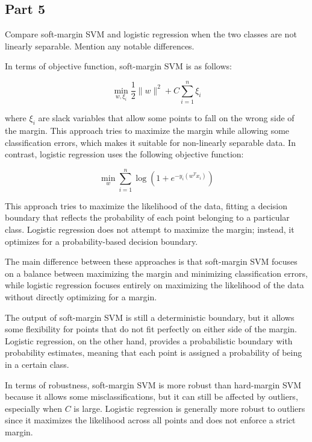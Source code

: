 \subsection{Part 5}
Compare soft-margin SVM and logistic regression when the two classes are not linearly separable. Mention any notable differences.
\begin{qsolve}
	\begin{qsolve}[]
		In terms of objective function, soft-margin SVM is as follows:

		\[
		\min_{w, \xi_i} \frac{1}{2} \|w\|^2 + C \sum_{i=1}^{n} \xi_i
		\]

		where \( \xi_i \) are slack variables that allow some points to fall on the wrong side of the margin. This approach tries to maximize the margin while allowing some classification errors, which makes it suitable for non-linearly separable data. In contrast, logistic regression uses the following objective function:

		\[
		\min_{w} \sum_{i=1}^{n} \log(1 + e^{-y_i(w^T x_i)})
		\]

		This approach tries to maximize the likelihood of the data, fitting a decision boundary that reflects the probability of each point belonging to a particular class. Logistic regression does not attempt to maximize the margin; instead, it optimizes for a probability-based decision boundary.

		The main difference between these approaches is that soft-margin SVM focuses on a balance between maximizing the margin and minimizing classification errors, while logistic regression focuses entirely on maximizing the likelihood of the data without directly optimizing for a margin.

		The output of soft-margin SVM is still a deterministic boundary, but it allows some flexibility for points that do not fit perfectly on either side of the margin. Logistic regression, on the other hand, provides a probabilistic boundary with probability estimates, meaning that each point is assigned a probability of being in a certain class.

		In terms of robustness, soft-margin SVM is more robust than hard-margin SVM because it allows some misclassifications, but it can still be affected by outliers, especially when \(C\) is large. Logistic regression is generally more robust to outliers since it maximizes the likelihood across all points and does not enforce a strict margin.

	\end{qsolve}
\end{qsolve}